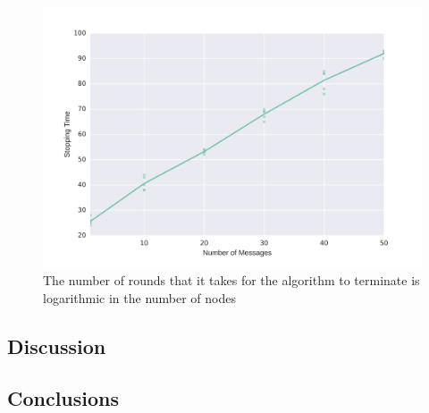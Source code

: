 \documentclass{article} %
\begin{document}
\begin{figure}
\centering
\includegraphics[width=\linewidth]{figures/rlnc-vary-n.png}
\caption{The number of rounds that it takes for the algorithm to terminate is logarithmic in the number of nodes}
\label{fig:rlnc-vary-n}
\end{figure} 


\subsection{Discussion}

\subsection{Conclusions}

\nocite{*}





\end{document}
